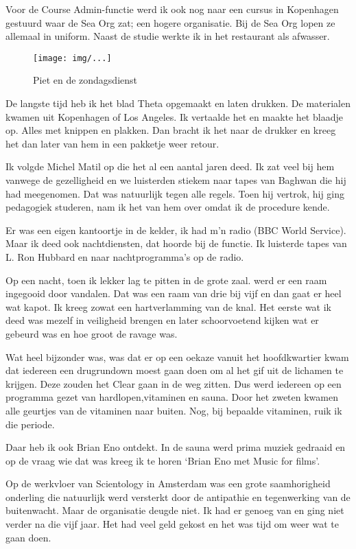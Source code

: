 \documentclass[10pt,twoside,openright]{memoir}
\begin{document}
Voor de Course Admin-functie werd ik ook nog naar een cursus in Kopenhagen gestuurd waar de Sea Org zat; een hogere organisatie. Bij de Sea Org lopen ze allemaal in uniform. Naast de studie werkte ik in het restaurant als afwasser.

\begin{figure}[t]
\texttt{[image: img/...]}
\caption{Piet en de zondagsdienst}
\end{figure}

De langste tijd heb ik het blad Theta opgemaakt en laten drukken. De materialen kwamen uit Kopenhagen of Los Angeles. Ik vertaalde het en maakte het blaadje op. Alles met knippen en plakken. Dan bracht ik het naar de drukker en kreeg het dan later van hem in een pakketje weer retour. 

Ik volgde Michel Matil op die het al een aantal jaren deed. Ik zat veel bij hem vanwege de gezelligheid en we luisterden stiekem naar tapes van Baghwan die hij had meegenomen. Dat was natuurlijk tegen alle regels. Toen hij vertrok, hij ging pedagogiek studeren, nam ik het van hem over omdat ik de procedure kende. 

Er was een eigen kantoortje in de kelder, ik had m’n radio (BBC World Service). Maar ik deed ook nachtdiensten, dat hoorde bij de functie. Ik luisterde tapes van L. Ron Hubbard en naar nachtprogramma’s op de radio. 

Op een nacht, toen ik lekker lag te pitten in de grote zaal. werd er een raam ingegooid door vandalen. Dat was een raam van drie bij vijf en dan gaat er heel wat kapot. Ik kreeg zowat een hartverlamming van de knal. Het eerste wat ik deed was mezelf in veiligheid brengen en later schoorvoetend kijken wat er gebeurd was en hoe groot de ravage was.

Wat heel bijzonder was, was dat er op een oekaze vanuit het hoofdkwartier kwam dat iedereen een drugrundown moest gaan doen om al het gif uit de lichamen te krijgen. Deze zouden het Clear gaan in de weg zitten. Dus werd iedereen op een programma gezet van hardlopen,vitaminen en sauna. Door het zweten kwamen alle geurtjes van de vitaminen naar buiten. Nog, bij bepaalde vitaminen, ruik ik die periode. 

Daar heb ik ook Brian Eno ontdekt. In de sauna werd prima muziek gedraaid en op de vraag wie dat was kreeg ik te horen ‘Brian Eno met Music for films’.

Op de werkvloer van Scientology in Amsterdam was een grote saamhorigheid onderling die natuurlijk werd versterkt door de antipathie en tegenwerking van de buitenwacht. Maar de organisatie deugde niet. Ik had er genoeg van en ging niet verder na die vijf jaar. Het had veel geld gekost en het was tijd om weer wat te gaan doen.
\end{document}
